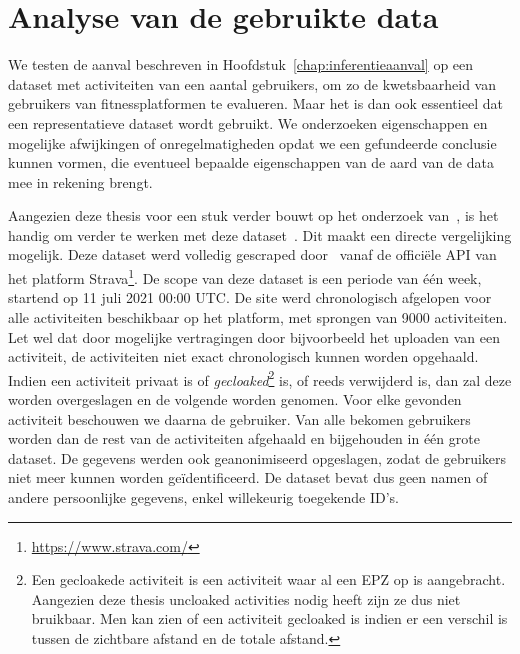 \chapter{Analyse van de gebruikte data}
We testen de aanval beschreven in Hoofdstuk~\ref{chap:inferentieaanval} op een
dataset met activiteiten van een aantal gebruikers, om zo de kwetsbaarheid van
gebruikers van fitnessplatformen te evalueren. Maar het is dan ook essentieel
dat een representatieve dataset wordt gebruikt. We onderzoeken eigenschappen en
mogelijke afwijkingen of onregelmatigheden opdat we een gefundeerde conclusie
kunnen vormen, die eventueel bepaalde eigenschappen van de aard van de data mee
in rekening brengt.

Aangezien deze thesis voor een stuk verder bouwt op het onderzoek
van~\citeauthor{Dhondt}, is het handig om verder te werken met deze
dataset~\cite{Dhondt}. Dit maakt een directe vergelijking mogelijk. Deze
dataset werd volledig gescraped door~\citeauthor{Dhondt} vanaf de officiële
\ac{API} van het platform Strava\footnote{\url{https://www.strava.com/}}. De
scope van deze dataset is een periode van één week, startend op 11 juli 2021
00:00 \ac{UTC}. De site werd chronologisch afgelopen voor alle activiteiten
beschikbaar op het platform, met sprongen van 9000 activiteiten. Let wel dat
door mogelijke vertragingen door bijvoorbeeld het uploaden van een activiteit,
de activiteiten niet exact chronologisch kunnen worden opgehaald. Indien een
activiteit privaat is of \textit{gecloaked}\footnote{Een gecloakede activiteit
    is een activiteit waar al een EPZ op is aangebracht. Aangezien deze thesis
    uncloaked activities nodig heeft zijn ze dus niet bruikbaar. Men kan zien of
    een activiteit gecloaked is indien er een verschil is tussen de zichtbare
    afstand en de totale afstand.} is, of reeds verwijderd is, dan zal deze worden
overgeslagen en de volgende worden genomen. Voor elke gevonden activiteit
beschouwen we daarna de gebruiker. Van alle bekomen gebruikers worden dan de
rest van de activiteiten afgehaald en bijgehouden in één grote dataset. De
gegevens werden ook geanonimiseerd opgeslagen, zodat de gebruikers niet meer
kunnen worden geïdentificeerd. De dataset bevat dus geen namen of andere
persoonlijke gegevens, enkel willekeurig toegekende ID's.

